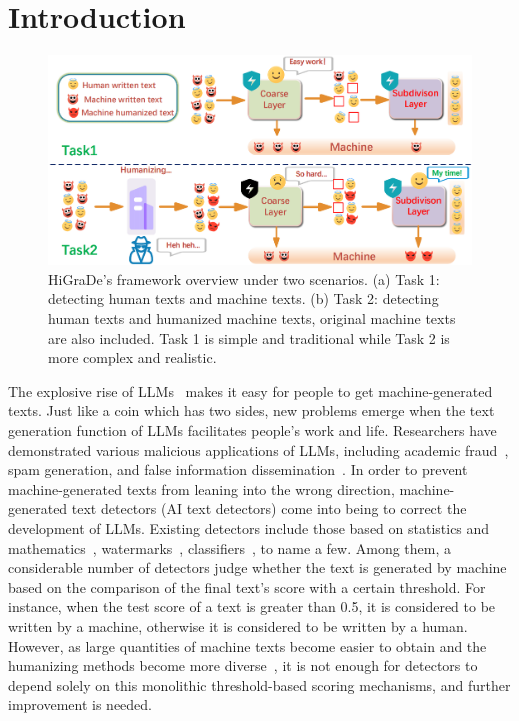 \documentclass[11pt]{article}
\newcommand{\greenCitep}[1]{\textcolor{darkgreen}{\citep{#1}}}
\begin{document}
	\section{Introduction}
	\begin{figure}
    \centering
    \includegraphics[width=0.9\linewidth]{pics/first-frame.png}
    \caption{HiGraDe's framework overview under two scenarios. (a) Task 1: detecting human texts and machine texts. (b) Task 2: detecting human texts and humanized machine texts, original machine texts are also included. Task 1 is simple and traditional while Task 2 is more complex and realistic.}
\label{fig:method}
\end{figure}
	The explosive rise of LLMs~\greenCitep{Claude2024,deepseekai2025,geminiteam2024geminifamilyhighlycapable} makes it easy for people to get machine-generated texts. Just like a coin which has two sides, new problems emerge when the text generation function of LLMs facilitates people's work and life. Researchers have demonstrated various malicious applications of LLMs, including academic fraud~\greenCitep{Perkins2023}, spam generation, and false information dissemination~\greenCitep{hazell2023spear,Weidinger2022taxonomy}. In order to prevent machine-generated texts from leaning into the wrong direction, machine-generated text detectors (AI text detectors) come into being to correct the development of LLMs. Existing detectors include those based on statistics and mathematics~\greenCitep{mitchell2023detectgpt,tian2023gptzero}, watermarks~\greenCitep{gu2022watermarking,kirchenbauer2023watermark}, classifiers~\greenCitep{guo2023simpleai,wang2023seqxgpt}, to name a few. Among them, a considerable number of detectors judge whether the text is generated by machine based on the comparison of the final text's score with a certain threshold. For instance, when the test score of a text is greater than 0.5, it is considered to be written by a machine, otherwise it is considered to be written by a human. However, as large quantities of machine texts become easier to obtain and the humanizing methods become more diverse~\greenCitep{zhou2024navigatingshadows,huang2024ai}, it is not enough for detectors to depend solely on this monolithic threshold-based scoring mechanisms, and further improvement is needed.
\end{document}
